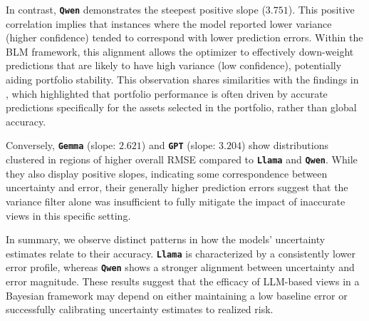 In contrast, \textbf{\texttt{Qwen}} demonstrates the steepest positive slope ($3.751$). This positive correlation implies that instances where the model reported lower variance (higher confidence) tended to correspond with lower prediction errors. Within the BLM framework, this alignment allows the optimizer to effectively down-weight predictions that are likely to have high variance (low confidence), potentially aiding portfolio stability. This observation shares similarities with the findings in \cite{lee2025return}, which highlighted that portfolio performance is often driven by accurate predictions specifically for the assets selected in the portfolio, rather than global accuracy. 

Conversely, \textbf{\texttt{Gemma}} (slope: $2.621$) and \textbf{\texttt{GPT}} (slope: $3.204$) show distributions clustered in regions of higher overall RMSE compared to \textbf{\texttt{Llama}} and \textbf{\texttt{Qwen}}. 
While they also display positive slopes, indicating some correspondence between uncertainty and error, their generally higher prediction errors suggest that the variance filter alone was insufficient to fully mitigate the impact of inaccurate views in this specific setting.

In summary, we observe distinct patterns in how the models' uncertainty estimates relate to their accuracy. \textbf{\texttt{Llama}} is characterized by a consistently lower error profile, whereas \textbf{\texttt{Qwen}} shows a stronger alignment between uncertainty and error magnitude. These results suggest that the efficacy of LLM-based views in a Bayesian framework may depend on either maintaining a low baseline error or successfully calibrating uncertainty estimates to realized risk.